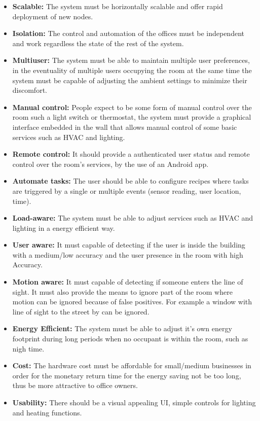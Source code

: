 \begin{itemize}
  \item \textbf{Scalable:} The system must be horizontally scalable and offer rapid deployment of new nodes.
  
  \item \textbf{Isolation:} The control and automation of the offices must be independent and work regardless the state of the rest of the system.
  
  \item \textbf{Multiuser:} The system must be able to maintain multiple user preferences, in the eventuality of multiple users occupying the room at the same time the system must be capable of adjusting the ambient settings to minimize their discomfort. 
  
  \item \textbf{Manual control:} People expect to be some form of manual control over the room such a light switch or thermostat, the system must provide a graphical interface embedded in the wall that allows manual control of some basic services such as HVAC and lighting.
  
  \item \textbf{Remote control:} It should provide a authenticated user status and remote control over the room's services, by the use of an Android app.
  
  \item \textbf{Automate tasks:} The user should be able to configure recipes where tasks are triggered by a single or multiple events (sensor reading, user location, time).
  
  \item \textbf{Load-aware:} The system must be able to adjust services such as HVAC and lighting in a energy efficient way.
  
  \item \textbf{User aware:} It must capable of detecting if the user is inside the building with a medium/low accuracy and the user presence in the room with high Accuracy.
  
  \item \textbf{Motion aware:} It must capable of detecting if someone enters the line of sight. It must also provide the means to ignore part of the room where motion can be ignored because of false positives. For example a window with line of sight to the street by can be ignored.
  
  \item \textbf{Energy Efficient:} The system must be able to adjust it's own energy footprint during long periods when no occupant is within the room, such as nigh time.  
  
  \item \textbf{Cost:} The hardware cost must be affordable for small/medium businesses in order for the monetary return time for the energy saving not be too long, thus be more attractive to office owners.
  
  \item \textbf{Usability:} There should be a visual appealing \ac{UI}, simple controls for lighting and heating functions.
    

\end{itemize}
